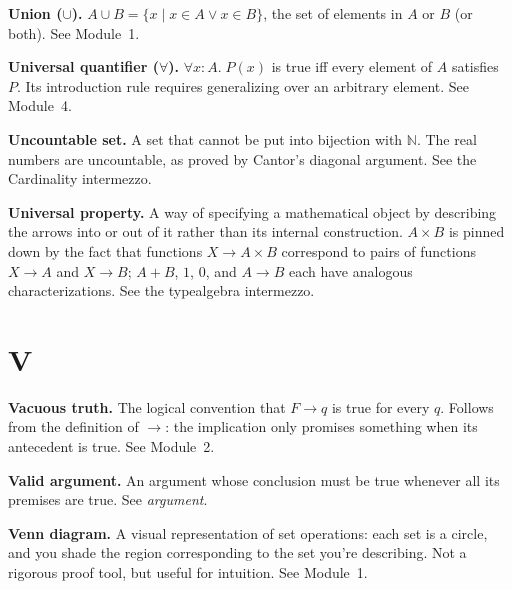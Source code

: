\documentclass[11pt]{article}
\begin{document}
\textbf{Union ($\cup$).} $A \cup B = \{x \mid x \in A \vee x \in B\}$, the set of elements in $A$ or $B$ (or both). See Module~1.

\textbf{Universal quantifier ($\forall$).} $\forall x : A.\; P(x)$ is true iff every element of $A$ satisfies $P$. Its introduction rule requires generalizing over an arbitrary element. See Module~4.

\textbf{Uncountable set.} A set that cannot be put into bijection with $\mathbb{N}$. The real numbers are uncountable, as proved by Cantor's diagonal argument. See the Cardinality intermezzo.

\textbf{Universal property.} A way of specifying a mathematical object by describing the arrows into or out of it rather than its internal construction. $A \times B$ is pinned down by the fact that functions $X \to A \times B$ correspond to pairs of functions $X \to A$ and $X \to B$; $A + B$, $1$, $0$, and $A \to B$ each have analogous characterizations. See the typealgebra intermezzo.

\section*{V}

\textbf{Vacuous truth.} The logical convention that $F \to q$ is true for every $q$. Follows from the definition of $\to$: the implication only promises something when its antecedent is true. See Module~2.

\textbf{Valid argument.} An argument whose conclusion must be true whenever all its premises are true. See \emph{argument}.

\textbf{Venn diagram.} A visual representation of set operations: each set is a circle, and you shade the region corresponding to the set you're describing. Not a rigorous proof tool, but useful for intuition. See Module~1.
\end{document}
